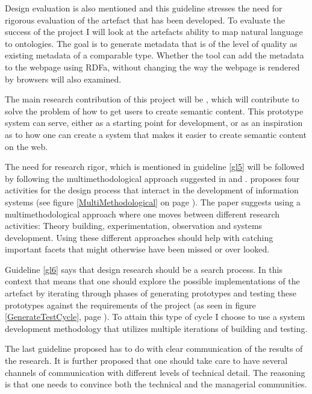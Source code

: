 Design evaluation is also mentioned and this guideline stresses the need for rigorous evaluation of the artefact that has been developed.
To evaluate the success of the project I will look at the artefacts ability to map natural language to ontologies.
The goal is to generate metadata that is of the level of quality as existing metadata of a comparable type.
Whether the tool can add the metadata to the webpage using RDFa, without changing the way the webpage is rendered by browsers will also examined.

The main research contribution of this project will be \theartefact,
which will contribute to solve the problem of how to get users to create semantic content.
This prototype system can serve, either as a starting point for development,
or as an inspiration as to how one can create a system that makes it easier to create semantic content on the web.

The need for research rigor, which is mentioned in guideline \ref{gl5} will be followed by following the multimethodological approach suggested in \citet{Chen1990} and \citet{NunamakerJr1990}.
\citet{Chen1990} proposes four activities for the design process that interact in the development of information systems
(see figure \ref{MultiMethodological} on page \pageref{MultiMethodological}).
The paper suggests using a multimethodological approach where one moves between different research activities:
Theory building, experimentation, observation and systems development.
Using these different approaches should help with catching important facets that might otherwise have been missed or over looked.

Guideline \ref{gl6} says that design research should be a search process.
In this context that means that one should explore the possible implementations of the artefact by iterating through phases of
generating prototypes and testing these prototypes against the requirements of the project (as seen in figure \ref{GenerateTestCycle},
page \pageref{GenerateTestCycle}).
To attain this type of cycle I choose to use a system development methodology that utilizes multiple iterations of building and testing.

The last guideline proposed has to do with clear communication of the results of the research.
It is further proposed that one should take care to have several channels of communication with different levels of technical detail.
The reasoning is that one needs to convince both the technical and the managerial communities.


